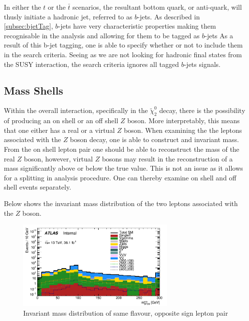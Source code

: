 \noindent In either the $t$ or the $\bar{t}$ scenarios, the resultant bottom quark, or anti-quark, will thusly initiate a hadronic jet, referred to as $b$-jets.
As described in \ref{subsec:bjetTag}, $b$-jets have very characteristic properties making them recognisable in the analysis and allowing for them to be tagged as $b$-jets
As a result of this b-jet tagging, one is able to specify whether or not to include them in the search criteria.
Seeing as we are not looking for hadronic final states from the SUSY interaction, the search criteria ignores all tagged $b$-jets signals.

\subsection{Mass Shells}
Within the overall interaction, specifically in the $\tilde{\chi}^{0}_{2}$ decay, there is the possibility of producing an on shell or an off shell $Z$ boson. 
More interpretably, this means that one either has a real or a virtual $Z$ boson.
When examining the the leptons associated with the $Z$ boson decay, one is able to construct and invariant mass.
From the on shell lepton pair one should be able to reconstruct the mass of the real $Z$ boson, however, virtual $Z$ bosons may result in the reconstruction of a mass significantly above or below the true value.
This is not an issue as it allows for a splitting in analysis procedure. 
One can thereby examine on shell and off shell events separately.

Below shows the invariant mass distribution of the two leptons associated with the $Z$ boson.

\begin{figure}[H] %
   \centering
   \includegraphics[width=0.7\textwidth]{Pictures/ZmassDist.png} 
   \caption{Invariant mass distribution of same flavour, opposite sign lepton pair}
   \label{fig:L1L2InvariantMass}
\end{figure}

